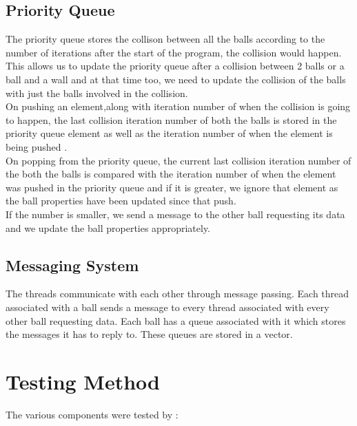 \documentclass[a4paper]{article}
\begin{document}
\subsection{Priority Queue}
The priority queue stores the collison between all the balls according to the number of iterations after the start of the program, the collision would happen.\\ This allows us to update the priority queue after a collision between 2 balls or a ball and a wall and at that time too, we need to update the collision of the balls with just the balls involved in the collision. \\
On pushing an element,along with iteration number of when the collision is going to happen, the last collision iteration number of both the balls is stored in the priority queue element as well as the iteration number of when the element is being pushed .\\
On popping from the priority queue, the current last collision iteration number of the both the balls is compared with the iteration number of when the element was pushed in the priority queue and if it is greater, we ignore that element as the ball properties have been updated since that push.\\
If the number is smaller, we send a message to the other ball requesting its data and we update the ball properties appropriately.

\subsection{Messaging System}
The threads communicate with each other through message passing. Each thread associated with a ball sends a message to every thread associated with every other ball requesting data. Each ball has a queue associated with it which stores the messages it has to reply to.  These queues are stored in a vector.

\section{Testing Method}
The various components were tested by : \\
\end{document}

